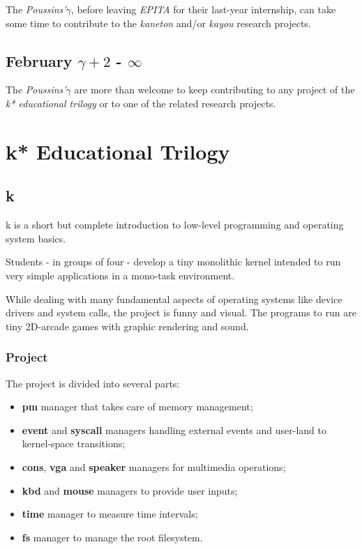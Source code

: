 \begin{multicols}{2}
The \textit{Poussins'$\gamma$}, before leaving \textit{EPITA} for their
last-year internship, can take some time to contribute to the \textit{kaneton}
and/or \textit{kayou} research projects.

%
%

\subsection{February $\gamma + 2$ - $\infty$}

The \textit{Poussins'$\gamma$} are more than welcome to keep contributing
to any project of the \textit{k* educational trilogy} or to one of the related
research projects.

%
%

\section{k* Educational Trilogy}

%
%

\subsection{k}

k is a short but complete introduction to low-level programming and
operating system basics.

Students - in groups of four - develop a tiny monolithic kernel
intended to run very simple applications in a mono-task environment.

While dealing with many fundamental aspects of operating systems like
device drivers and system calls, the project is funny and visual. The
programs to run are tiny 2D-arcade games with graphic rendering and
sound.


\subsubsection{Project}

The project is divided into several parts:

\begin{itemize}
  \item
    \textbf{pm} manager that takes care of memory management;
  \item
    \textbf{event} and \textbf{syscall} managers handling external
    events and user-land to kernel-space transitions;
  \item
    \textbf{cons}, \textbf{vga} and \textbf{speaker} managers for
    multimedia operations;
  \item
    \textbf{kbd} and \textbf{mouse} managers to provide user inputs;
  \item
    \textbf{time} manager to measure time intervals;
  \item
    \textbf{fs} manager to manage the root filesystem.
\end{itemize}


\end{multicols}
